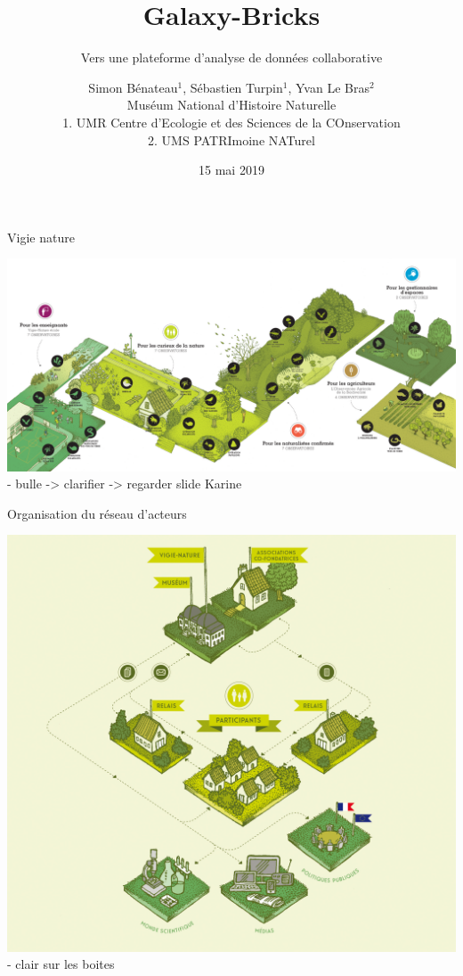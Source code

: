 \documentclass[ignorenonframetext,aspectratio=129]{beamer}
\title{Galaxy-Bricks}
\subtitle{Vers une plateforme d'analyse de données collaborative}
\author{Simon Bénateau\(^1\), Sébastien Turpin\(^1\), Yvan Le
Bras\(^2\)\\[2\baselineskip]Muséum National d'Histoire Naturelle\\
1. UMR Centre d'Ecologie et des Sciences de la COnservation\\
2. UMS PATRImoine NATurel}
\date{15 mai 2019}
\begin{document}
\frame{\titlepage}

\begin{frame}{Vigie nature}

\includegraphics{figures/observatoires_vigienature_aml.jpg} - bulle
-\textgreater{} clarifier -\textgreater{} regarder slide Karine

\end{frame}

\begin{frame}{Organisation du réseau d'acteurs}

\includegraphics{figures/Vigie-Nature-Network.jpg} - clair sur les
boites

\end{frame}
\end{document}
